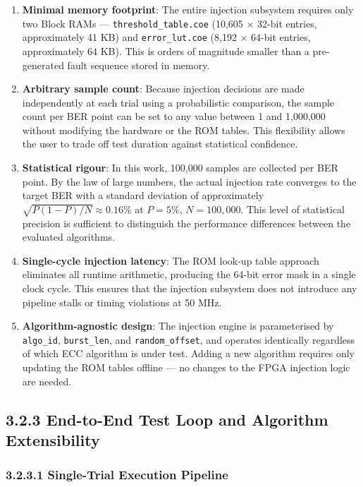 \documentclass[
  english,
  12pt,
]{report}
\begin{document}
\begin{enumerate}
\def\labelenumi{\arabic{enumi}.}
\item
  \textbf{Minimal memory footprint}: The entire injection subsystem
  requires only two Block RAMs --- \texttt{threshold\_table.coe} (10,605
  × 32-bit entries, approximately 41 KB) and \texttt{error\_lut.coe}
  (8,192 × 64-bit entries, approximately 64 KB). This is orders of
  magnitude smaller than a pre-generated fault sequence stored in
  memory.
\item
  \textbf{Arbitrary sample count}: Because injection decisions are made
  independently at each trial using a probabilistic comparison, the
  sample count per BER point can be set to any value between 1 and
  1,000,000 without modifying the hardware or the ROM tables. This
  flexibility allows the user to trade off test duration against
  statistical confidence.
\item
  \textbf{Statistical rigour}: In this work, 100,000 samples are
  collected per BER point. By the law of large numbers, the actual
  injection rate converges to the target BER with a standard deviation
  of approximately \(\sqrt{P(1-P)/N} \approx 0.16\%\) at \(P = 5\%\),
  \(N = 100{,}000\). This level of statistical precision is sufficient
  to distinguish the performance differences between the evaluated
  algorithms.
\item
  \textbf{Single-cycle injection latency}: The ROM look-up table
  approach eliminates all runtime arithmetic, producing the 64-bit error
  mask in a single clock cycle. This ensures that the injection
  subsystem does not introduce any pipeline stalls or timing violations
  at 50 MHz.
\item
  \textbf{Algorithm-agnostic design}: The injection engine is
  parameterised by \texttt{algo\_id}, \texttt{burst\_len}, and
  \texttt{random\_offset}, and operates identically regardless of which
  ECC algorithm is under test. Adding a new algorithm requires only
  updating the ROM tables offline --- no changes to the FPGA injection
  logic are needed.
\end{enumerate}

\subsection{3.2.3 End-to-End Test Loop and Algorithm
Extensibility}\label{end-to-end-test-loop-and-algorithm-extensibility}

\subsubsection{3.2.3.1 Single-Trial Execution
Pipeline}\label{single-trial-execution-pipeline}
\end{document}
